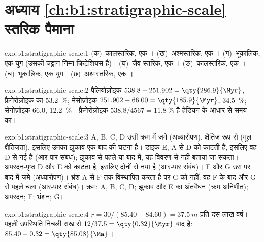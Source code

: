 \section*{अध्याय \ref{ch:b1:stratigraphic-scale} --- स्तरिक पैमाना}

\begin{solution}{exo:b1:stratigraphic-scale:1}
(क)~कालस्तरिक, एक । (ख)~अश्मस्तरिक, एक ।
(ग)~भूकालिक, एक युग (उसकी चट्टान निम्न क्रिटेशियस  है)।
(घ)~जैव-स्तरिक, एक । (ङ)~कालस्तरिक, एक ।
(च)~भूकालिक, एक युग। (छ)~अश्मस्तरिक, एक ।
\end{solution}

\begin{solution}{exo:b1:stratigraphic-scale:2}
पैलियोज़ोइक $538.8 - 251.902 = \qty{286.9}{\Myr}$, फ़ैनेरोज़ोइक का \qty{53.2}{\%};
मेसोज़ोइक $251.902 - 66.00 = \qty{185.9}{\Myr}$, \qty{34.5}{\%}; सेनोज़ोइक
\qty{66.0}{\Myr}, \qty{12.2}{\%}। फ़ैनेरोज़ोइक $538.8/4567 = \qty{11.8}{\%}$ है
हेडियन के आधार से समय का।
\end{solution}

\begin{solution}{exo:b1:stratigraphic-scale:3}
A, B, C, D उसी क्रम में जमे (अध्यारोपण), क्षैतिज रूप से (मूल क्षैतिजता), इसलिए
उनका झुकाव एक बाद की घटना है। डाइक E, A से D को काटती है, इसलिए वह D से नई है
(आर-पार संबंध); झुकाव से पहले या बाद में, यह विवरण से नहीं बताया जा सकता। अपरदन-पृष्ठ
D और E को काटता है, इसलिए दोनों से नया है (आर-पार संबंध)। F और G उस पर बाद में
जमे (अध्यारोपण)। भ्रंश A से F तक विस्थापित करता है पर G को नहीं: वह F के बाद और G से
पहले चला (आर-पार संबंध)। क्रम: A, B, C, D; झुकाव और E का अंतर्वेधन (क्रम अनिर्णीत);
अपरदन; F; भ्रंशन; G।
\end{solution}

\begin{solution}{exo:b1:stratigraphic-scale:4}
$r = 30/(85.40 - 84.60) = \qty{37.5}{m}$ प्रति दस लाख वर्ष। पहली उपस्थिति निचली राख
से $12/37.5 = \qty{0.32}{\Myr}$ बाद है: $85.40 - 0.32 =
\qty{85.08}{\Ma}$।
\end{solution}

